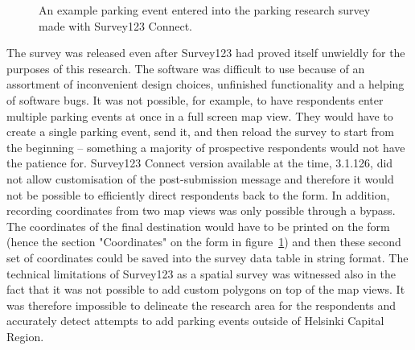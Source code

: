 \begin{figure}[H]%
    \centering
    \caption[The unused parking survey created with Survey123]{An example parking event entered into the parking research survey made with Survey123 Connect.}%
    \label{fig:survey123}%
\end{figure}

The survey was released even after Survey123 had proved itself unwieldly for the purposes of this research. The software was difficult to use because of an assortment of inconvenient design choices, unfinished functionality and a helping of software bugs. It was not possible, for example, to have respondents enter multiple parking events at once in a full screen map view. They would have to create a single parking event, send it, and then reload the survey to start from the beginning -- something a majority of prospective respondents would not have the patience for. Survey123 Connect version available at the time, 3.1.126, did not allow customisation of the post-submission message and therefore it would not be possible to efficiently direct respondents back to the form. In addition, recording coordinates from two map views was only possible through a bypass. The coordinates of the final destination would have to be printed on the form (hence the section "Coordinates" on the form in figure~\ref{fig:survey123}) and then these second set of coordinates could be saved into the survey data table in string format. The technical limitations of Survey123 as a spatial survey was witnessed also in the fact that it was not possible to add custom polygons on top of the map views. It was therefore impossible to delineate the research area for the respondents and accurately detect attempts to add parking events outside of Helsinki Capital Region.

